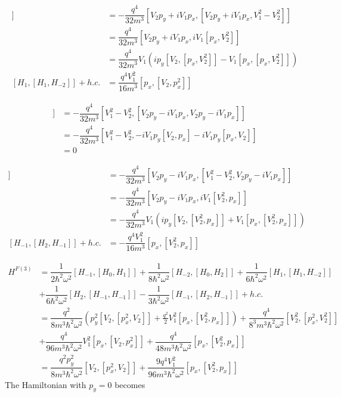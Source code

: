 \begin{align}
  [H_1,[H_1, H_{-2}]] &= -\dfrac{q^4}{32m^3} [ V_2 p_y + i V_1 p_x, [V_2 p_y + i V_1 p_x, V_1^2 - V_2^2]] \nonumber \\
  &= \dfrac{q^4}{32m^3} [ V_2 p_y + i V_1 p_x, iV_1 [p_x,V_2^2]] \nonumber \\
  &= \dfrac{q^4}{32m^3} V_1 ( ip_y [V_2,[p_x,V_2^2]] - V_1 [p_x,[p_x,V_2^2]]) \nonumber \\
  [H_1,[H_1,H_{-2}]] + h.c. &= \dfrac{q^4 V_1^2}{16m^3} [p_x,[V_2,p_x^2]]
\end{align}

\begin{align}
  [H_2,[H_{-1},H_{-1}]] &= -\dfrac{q^4}{32m^3} [V_1^2 - V_2^2, [V_2 p_y - i V_1 p_x, V_2 p_y - i V_1 p_x]] \nonumber \\
  &= -\dfrac{q^4}{32m^3} [V_1^2 - V_2^2, -i V_1p_y [V_2,p_x] - i V_1p_y [p_x,V_2]] \nonumber \\
  &= 0
\end{align}

\begin{align}
  [H_{-1}, [H_2, H_{-1}]] &= -\dfrac{q^4}{32m^3} [V_2 p_y - i V_1 p_x, [V_1^2 - V_2^2, V_2 p_y - i V_1 p_x]] \nonumber \\
  &= -\dfrac{q^4}{32m^3} [V_2 p_y - i V_1 p_x, iV_1[V_2^2,p_x]] \nonumber \\
  &= -\dfrac{q^4}{32m^3} V_1( i p_y [V_2,[V_2^2,p_x]] + V_1[p_x,[V_2^2,p_x]]) \nonumber \\
  [H_{-1}, [H_2, H_{-1}]] + h.c. &= -\dfrac{q^4V_1^2}{16m^3} [p_x,[V_2^2,p_x]]
\end{align}

\begin{align}
  H^{F(3)} &= \dfrac{1}{2\hbar^2\omega^2} [H_{-1},[H_0,H_1]] + \dfrac{1}{8\hbar^2\omega^2} [H_{-2},[H_0,H_2]] + \dfrac{1}{6\hbar^2\omega^2} [H_1,[H_1,H_{-2}]] \nonumber \\
  &+ \dfrac{1}{6\hbar^2\omega^2} [H_2,[H_{-1},H_{-1}]] - \dfrac{1}{3\hbar^2\omega^2} [H_{-1},[H_2,H_{-1}]] + h.c. \\
  &= \dfrac{q^2}{8m^3\hbar^2\omega^2} \left( p_y^2 [V_2,[p_x^2,V_2]] + \tfrac{q^2}{2} V_1^2 [p_x,[V_2^2,p_x]]\right) + \dfrac{q^4}{8^3m^3\hbar^2\omega^2} [V_2^2,[p_x^2,V_2^2]] \nonumber \\
  &+ \dfrac{q^4}{96m^3\hbar^2\omega^2} V_1^2 [p_x,[V_2,p_x^2]] + \dfrac{q^4}{48m^3\hbar^2\omega^2} [p_x,[V_2^2,p_x]] \\
  &= \dfrac{q^2 p_y^2}{8m^3\hbar^2\omega^2} [V_2,[p_x^2,V_2]] + \dfrac{9q^4V_1^2}{96m^3\hbar^2\omega^2} [p_x,[V_2^2,p_x]]
\end{align}
The Hamiltonian with $p_y=0$ becomes


